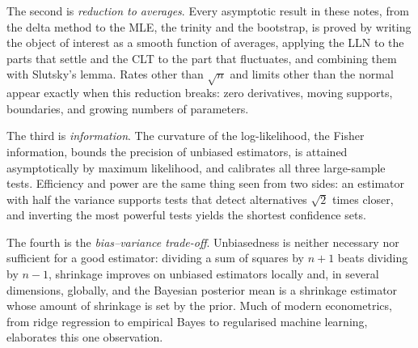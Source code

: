 \documentclass[11pt,a4paper]{article}
\begin{document}
The second is \emph{reduction to averages}. Every asymptotic result in these notes, from the delta method to the MLE, the trinity and the bootstrap, is proved by writing the object of interest as a smooth function of averages, applying the LLN to the parts that settle and the CLT to the part that fluctuates, and combining them with Slutsky's lemma. Rates other than $\sqrt n$ and limits other than the normal appear exactly when this reduction breaks: zero derivatives, moving supports, boundaries, and growing numbers of parameters.

The third is \emph{information}. The curvature of the log-likelihood, the Fisher information, bounds the precision of unbiased estimators, is attained asymptotically by maximum likelihood, and calibrates all three large-sample tests. Efficiency and power are the same thing seen from two sides: an estimator with half the variance supports tests that detect alternatives $\sqrt2$ times closer, and inverting the most powerful tests yields the shortest confidence sets.

The fourth is the \emph{bias--variance trade-off}. Unbiasedness is neither necessary nor sufficient for a good estimator: dividing a sum of squares by $n+1$ beats dividing by $n-1$, shrinkage improves on unbiased estimators locally and, in several dimensions, globally, and the Bayesian posterior mean is a shrinkage estimator whose amount of shrinkage is set by the prior. Much of modern econometrics, from ridge regression to empirical Bayes to regularised machine learning, elaborates this one observation.

\end{document}
